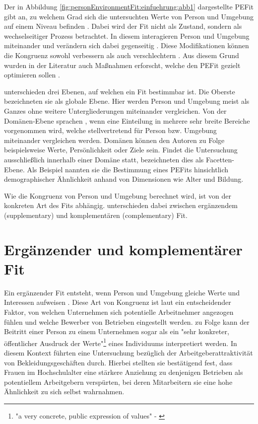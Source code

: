 Der in Abbildung \ref{fig:personEnvironmentFit:einfuehrung:abb1} dargestellte \ac{PEFit} gibt an, zu welchem Grad sich die untersuchten Werte von Person und Umgebung auf einem Niveau befinden \cite[S. 3]{chatman:1989}. Dabei wird der Fit nicht als Zustand, sondern als wechselseitiger Prozess betrachtet. In diesem interagieren Person und Umgebung miteinander und verändern sich dabei gegenseitig \cite[S. 21f.]{roberts:2006}. Diese Modifikationen können die Kongruenz sowohl verbessern als auch verschlechtern \cite[S. 4]{caplan:1987}. Aus diesem Grund wurden in der Literatur auch Maßnahmen erforscht, welche den \ac{PEFit} gezielt optimieren sollen \cite[S. 16]{cable:2001}.

\textcite[S. 6f.]{edwards:2007} unterschieden drei Ebenen, auf welchen ein Fit bestimmbar ist. Die Oberste bezeichneten sie als globale Ebene. Hier werden Person und Umgebung meist als Ganzes ohne weitere Untergliederungen miteinander vergleichen. Von der Domänen-Ebene sprachen \textcite[S. 7f.]{edwards:2007}, wenn eine Einteilung in mehrere sehr breite Bereiche vorgenommen wird, welche stellvertretend für Person bzw. Umgebung miteinander vergleichen werden. Domänen können den Autoren zu Folge beispielsweise Werte, Persönlichkeit oder Ziele sein. Findet die Untersuchung ausschließlich innerhalb einer Domäne statt, bezeichneten \textcite[S. 7f.]{edwards:2007} dies als Facetten-Ebene. Als Beispiel nannten sie die Bestimmung eines \acp{PEFit} hinsichtlich demographischer Ähnlichkeit anhand von Dimensionen wie Alter und Bildung.

Wie die Kongruenz von Person und Umgebung berechnet wird, ist von der konkreten Art des Fits abhängig. \textcite[S. 1]{muchinsky:1987} unterschieden dabei zwischen ergänzendem (supplementary) und komplementären (complementary) Fit.

\section{Ergänzender und komplementärer Fit}
\label{ch:personEnvironmentFit:supplementaryUndComplementary}
Ein ergänzender Fit entsteht, wenn Person und Umgebung gleiche Werte und Interessen aufweisen \cite[S. 2f.]{muchinsky:1987}. Diese Art von Kongruenz ist laut \textcite[S. 1ff.]{schneider:1987} ein entscheidender Faktor, von welchen Unternehmen sich potentielle Arbeitnehmer angezogen fühlen und welche Bewerber von Betrieben eingestellt werden. \textcite[S. 4, Z. 25f.]{popovich:1982} zu Folge kann der Beitritt einer Person zu einem Unternehmen sogar als ein "sehr konkreter, öffentlicher Ausdruck der Werte"\footnote{"a very concrete, public expression of values" - \textcite[S. 4, Z. 25f.]{popovich:1982}} eines Individuums interpretiert werden. In diesem Kontext führten \textcite[S. 7]{devendorf:2008} eine Untersuchung bezüglich der Arbeitgeberattraktivität von Bekleidungsgeschäften durch. Hierbei stellten sie bestätigend fest, dass Frauen im Hochschulalter eine stärkere Anziehung zu denjenigen Betrieben als potentiellem Arbeitgebern verspürten, bei deren Mitarbeitern sie eine hohe Ähnlichkeit zu sich selbst wahrnahmen.

